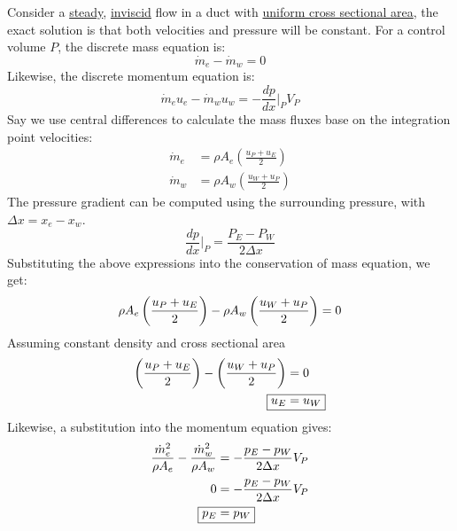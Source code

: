 \documentclass[11pt]{article}
\begin{document}
Consider a \uline{steady}, \uline{inviscid} flow in a duct with \uline{uniform cross sectional area}, the exact solution is that both velocities and pressure will be constant.
For a control volume \(P\), the discrete mass equation is:
\begin{equation*}
\dot{m}_e - \dot{m}_w = 0
\end{equation*}
Likewise, the discrete momentum equation is:
\begin{equation*}
\dot{m}_eu_e - \dot{m}_wu_w = - \frac{dp}{dx} \biggr \rvert_P V_P
\end{equation*}
Say we use central differences to calculate the mass fluxes base on the integration point velocities:
\begin{equation*}
\begin{aligned}
\dot{m}_e &= \rho A_e \left( \frac{u_P + u_E} {2}\right)\\
\dot{m}_w &= \rho A_w \left( \frac{u_W + u_P} {2}\right)
\end{aligned}
\end{equation*}
The pressure gradient can be computed using the surrounding pressure, with \(\Delta x = x_e - x_w\). 
\begin{equation*}
\frac{dp}{dx} \biggr \rvert_P = \frac{P_E-P_W}{2\Delta x}
\end{equation*}
Substituting the above expressions into the conservation of mass equation, we get:
\begin{equation*}
\rho A_e \left( \frac{u_P + u_E} {2}\right) - \rho A_w \left( \frac{u_W + u_P} {2}\right) = 0\\
\end{equation*}
Assuming constant density and cross sectional area
\begin{equation*}
\begin{aligned}
\left( \frac{u_P + u_E} {2}\right) - \left( \frac{u_W + u_P} {2}\right) &= 0\\
\Aboxed{u_E &= u_W}
\end{aligned}
\end{equation*}
Likewise, a substitution into the momentum equation gives:
\begin{equation*}
\begin{aligned}
\frac{\dot{m}^2_e}{\rho A_e } - \frac{\dot{m}^2_w}{\rho A_w } &= -\frac{p_E-p_W}{2\Delta x} V_P\\
0 &= -\frac{p_E-p_W}{2\Delta x} V_P\\
\Aboxed{p_E &= p_W}
\end{aligned}
\end{equation*}
\end{document}
